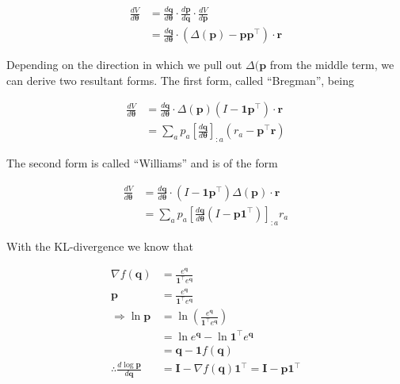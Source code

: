 \documentclass[10pt]{article}
\theoremstyle{definition}
\begin{document}
\begin{equation*}
\begin{aligned}
\frac{dV}{d\pmb{\theta}} & = \frac{d\mathbf{q}}{d\pmb{\theta}} \cdot \frac{d\mathbf{p}}{d\mathbf{q}} \cdot \frac{dV}{d\mathbf{p}} \\
& = \frac{d\mathbf{q}}{d\pmb{\theta}} \cdot (\Delta(\mathbf{p}) - \mathbf{p}\mathbf{p}^\top) \cdot \mathbf{r}
\end{aligned}
\end{equation*}

\noindent
Depending on the direction in which we pull out $\Delta(\mathbf{p}$ from the middle term, we can derive two resultant forms. The first form, called ``Bregman'', being

\begin{equation*}
\begin{aligned}
\frac{dV}{d\pmb{\theta}} & = \frac{d\mathbf{q}}{d\pmb{\theta}} \cdot \Delta(\mathbf{p}) (I - \mathbf{1}\mathbf{p}^\top) \cdot \mathbf{r} \\
& = \sum_a p_a \left[\frac{d\mathbf{q}}{d\pmb{\theta}}\right]_{:a}(r_a - \mathbf{p}^\top \mathbf{r})
\end{aligned}
\end{equation*}

\noindent 
The second form is called ``Williams'' and is of the form

\begin{equation*}
\begin{aligned}
\frac{dV}{d\pmb{\theta}} & = \frac{d\mathbf{q}}{d\pmb{\theta}} \cdot (I - \mathbf{1}\mathbf{p}^\top) \Delta(\mathbf{p}) \cdot \mathbf{r} \\
& = \sum_a p_a \left[\frac{d\mathbf{q}}{d\pmb{\theta}}(I - \mathbf{p}\mathbf{1}^\top)\right]_{:a}r_a
\end{aligned}
\end{equation*}

\noindent
With the KL-divergence we know that

\begin{equation*}
\begin{aligned}
\nabla f(\mathbf{q}) & = \frac{e^{\mathbf{q}}}{\mathbf{1}^\top e^{\mathbf{q}}} \\
\mathbf{p} & = \frac{e^{\mathbf{q}}}{\mathbf{1}^\top e^{\mathbf{q}}} \\
\Rightarrow \ln\mathbf{p} & = \ln\left(\frac{e^{\mathbf{q}}}{\mathbf{1}^\top e^{\mathbf{q}}}\right) \\
& = \ln e^{\mathbf{q}} - \ln\mathbf{1}^\top e^{\mathbf{q}} \\
& = \mathbf{q} - \mathbf{1}f(\mathbf{q}) \\
\therefore \frac{d\log\mathbf{p}}{d\mathbf{q}} & = \mathbf{I} - \nabla f(\mathbf{q})\mathbf{1}^\top = \mathbf{I} - \mathbf{p}\mathbf{1}^\top 
\end{aligned}
\end{equation*}
\end{document}
